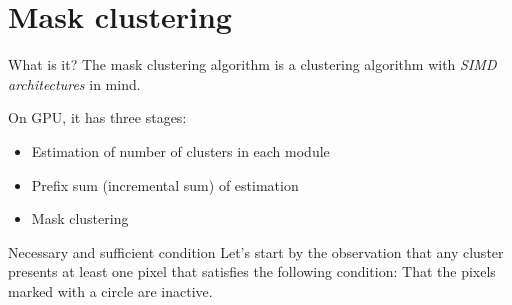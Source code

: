 \section{Mask clustering}

\begin{frame}{What is it?}
The mask clustering algorithm is a clustering algorithm with \emph{SIMD architectures} in mind.

On GPU, it has three stages:

\begin{itemize}
\item Estimation of number of clusters in each module
\item Prefix sum (incremental sum) of estimation
\item Mask clustering
\end{itemize}
\end{frame}

\begin{frame}{Necessary and sufficient condition}
Let's start by the observation that any cluster presents at least one pixel that satisfies the following condition: That the pixels marked with a circle are inactive.

\begin{center}
\end{center}
\end{frame}

